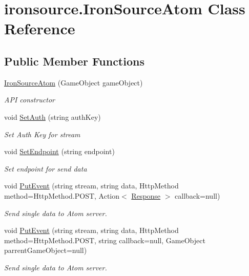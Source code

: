 \hypertarget{classironsource_1_1_iron_source_atom}{}\section{ironsource.\+Iron\+Source\+Atom Class Reference}
\label{classironsource_1_1_iron_source_atom}
\subsection*{Public Member Functions}
\begin{DoxyCompactItemize}
\item 
\hyperlink{classironsource_1_1_iron_source_atom_a1f2f1c44c50f86c96707dc89727364a1}{Iron\+Source\+Atom} (Game\+Object game\+Object)
\begin{DoxyCompactList}\small\item\em A\+PI constructor \end{DoxyCompactList}\item 
void \hyperlink{classironsource_1_1_iron_source_atom_ac312a3497a16162f40ce15f65c842ce5}{Set\+Auth} (string auth\+Key)
\begin{DoxyCompactList}\small\item\em Set Auth Key for stream \end{DoxyCompactList}\item 
void \hyperlink{classironsource_1_1_iron_source_atom_ab1d3a0624f705ea574f5e85f92d69454}{Set\+Endpoint} (string endpoint)
\begin{DoxyCompactList}\small\item\em Set endpoint for send data \end{DoxyCompactList}\item 
void \hyperlink{classironsource_1_1_iron_source_atom_a00a26fb95fdf553f02db0c37b6eff0b0}{Put\+Event} (string stream, string data, Http\+Method method=Http\+Method.\+P\+O\+ST, Action$<$ \hyperlink{classironsource_1_1_response}{Response} $>$ callback=null)
\begin{DoxyCompactList}\small\item\em Send single data to Atom server. \end{DoxyCompactList}\item 
void \hyperlink{classironsource_1_1_iron_source_atom_a149e6839c9c0fbfa391ed1bb70deeb94}{Put\+Event} (string stream, string data, Http\+Method method=Http\+Method.\+P\+O\+ST, string callback=null, Game\+Object parrent\+Game\+Object=null)
\begin{DoxyCompactList}\small\item\em Send single data to Atom server. \end{DoxyCompactList}\item 

\end{DoxyCompactItemize}
